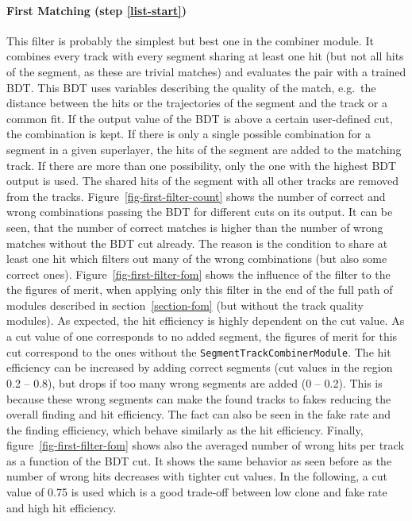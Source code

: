 \paragraph{First Matching (step \ref{list-start})}
This filter is probably the simplest but best one in the combiner module. It combines every track with every segment sharing at least one hit (but not all hits of the segment, as these are trivial matches) and evaluates the pair with a trained BDT. This BDT uses variables describing the quality of the match, e.g.\ the distance between the hits or the trajectories of the segment and the track or a common fit. If the output value of the BDT is above a certain user-defined cut, the combination is kept. If there is only a single possible combination for a segment in a given superlayer, the hits of the segment are added to the matching track. If there are more than one possibility, only the one with the highest BDT output is used. The shared hits of the segment with all other tracks are removed from the tracks. Figure~\ref{fig-first-filter-count} shows the number of correct and wrong combinations passing the BDT for different cuts on its output. It can be seen, that the number of correct matches is higher than the number of wrong matches without the BDT cut already. The reason is the condition to share at least one hit which filters out many of the wrong combinations (but also some correct ones). Figure~\ref{fig-first-filter-fom} shows the influence of the filter to the the figures of merit, when applying only this  filter in the end of the full path of modules described in section~\ref{section-fom} (but without the track quality modules). As expected, the hit efficiency is highly dependent on the cut value. As a cut value of one corresponds to no added segment, the figures of merit for this cut correspond to the ones without the \texttt{SegmentTrackCombinerModule}. The hit efficiency can be increased by adding correct segments (cut values in the region 0.2 -- 0.8), but drops if too many wrong segments are added (0 -- 0.2). This is because these wrong segments can make the found tracks to fakes reducing the overall finding and hit efficiency. The fact can also be seen in the fake rate and the finding efficiency, which behave similarly as the hit efficiency. Finally, figure~\ref{fig-first-filter-fom} shows also the averaged number of wrong hits per track as a function of the BDT cut. It shows the same behavior as seen before as the number of wrong hits decreases with tighter cut values. In the following, a cut value of 0.75 is used which is a good trade-off between low clone and fake rate and high hit efficiency.

